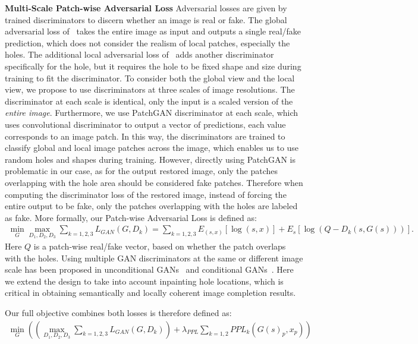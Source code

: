 \noindent\textbf{Multi-Scale Patch-wise Adversarial Loss} Adversarial losses are given by trained discriminators to discern whether an image is real or fake. The global adversarial loss of~\cite{pathak2016context} takes the entire image as input and outputs a single real/fake prediction, which does not consider the realism of local patches, especially the holes. The additional local adversarial loss of~\cite{iizuka2017globally} adds another discriminator specifically for the hole, but it requires the hole to be fixed shape and size during training to fit the discriminator. To consider both the global view and the local view, we propose to use discriminators at three scales of image resolutions. The discriminator at each scale is identical, only the input is a scaled version of the \textit{entire image}. Furthermore, we use PatchGAN discriminator at each scale, which uses convolutional discriminator to output a vector of predictions, each value corresponds to an image patch. In this way, the discriminators are trained to classify global and local image patches across the image, which enables us to use random holes and shapes during training. However, directly using PatchGAN is problematic in our case, as for the output restored image, only the patches overlapping with the hole area should be considered fake patches. Therefore when computing the discriminator loss of the restored image, instead of forcing the entire output to be fake, only the patches overlapping with the holes are labeled as fake. More formally, our Patch-wise Adversarial Loss is defined as: 
\begin{eqnarray}
\min\limits_G\max\limits_{D_1, D_2, D_3}\sum\limits_{k=1,2,3} L_{GAN}(G,D_k) = \sum\limits_{k=1,2,3}E_{(s,x)}[\log (s,x)] + E_s[\log (Q-D_k(s,G(s)))].
\end{eqnarray}
\label{eqn:adversarial_loss}
Here $Q$ is a patch-wise real/fake vector, based on whether the patch overlaps with the holes. Using multiple GAN discriminators at the same or different image scale has been proposed in unconditional GANs~\cite{durugkar2016generative} and conditional GANs~\cite{wang2017high}. Here we extend the design to take into account inpainting hole locations, which is critical in obtaining semantically and locally coherent image completion results.

Our full objective combines both losses is therefore defined as:
\begin{eqnarray}
\min\limits_G((\max\limits_{D_1, D_2, D_3}\sum\limits_{k=1,2,3} L_{GAN}(G,D_k))+\lambda_{PPL}\sum\limits_{k=1,2}PPL_k(G(s)_p, x_p))
\end{eqnarray}

